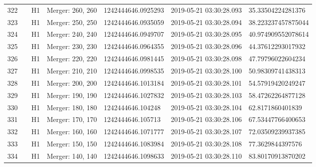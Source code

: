 \begin{longtable}{lllllll}
322  &                                                    &       H1 &  Merger: 260, 260 &  1242444646.0925293 &  2019-05-21 03:30:28.093 &   35.33504224281376 \\
323  &                                                    &       H1 &  Merger: 250, 250 &  1242444646.0935059 &  2019-05-21 03:30:28.094 &  38.223237457875044 \\
324  &                                                    &       H1 &  Merger: 240, 240 &  1242444646.0949707 &  2019-05-21 03:30:28.095 &  40.974909552078614 \\
325  &                                                    &       H1 &  Merger: 230, 230 &  1242444646.0964355 &  2019-05-21 03:30:28.096 &   44.37612293017932 \\
326  &                                                    &       H1 &  Merger: 220, 220 &  1242444646.0981445 &  2019-05-21 03:30:28.098 &   47.79796022604234 \\
327  &                                                    &       H1 &  Merger: 210, 210 &  1242444646.0998535 &  2019-05-21 03:30:28.100 &   50.98309741438313 \\
328  &                                                    &       H1 &  Merger: 200, 200 &  1242444646.1013184 &  2019-05-21 03:30:28.101 &   54.57919420249247 \\
329  &                                                    &       H1 &  Merger: 190, 190 &  1242444646.1027832 &  2019-05-21 03:30:28.103 &   58.47262264877128 \\
330  &                                                    &       H1 &  Merger: 180, 180 &   1242444646.104248 &  2019-05-21 03:30:28.104 &    62.8171860401839 \\
331  &                                                    &       H1 &  Merger: 170, 170 &   1242444646.105713 &  2019-05-21 03:30:28.106 &   67.53447766400653 \\
332  &                                                    &       H1 &  Merger: 160, 160 &  1242444646.1071777 &  2019-05-21 03:30:28.107 &   72.03509239937385 \\
333  &                                                    &       H1 &  Merger: 150, 150 &  1242444646.1083984 &  2019-05-21 03:30:28.108 &    77.3629844397576 \\
334  &                                                    &       H1 &  Merger: 140, 140 &  1242444646.1098633 &  2019-05-21 03:30:28.110 &   83.80170913870202 \\

\end{longtable}
